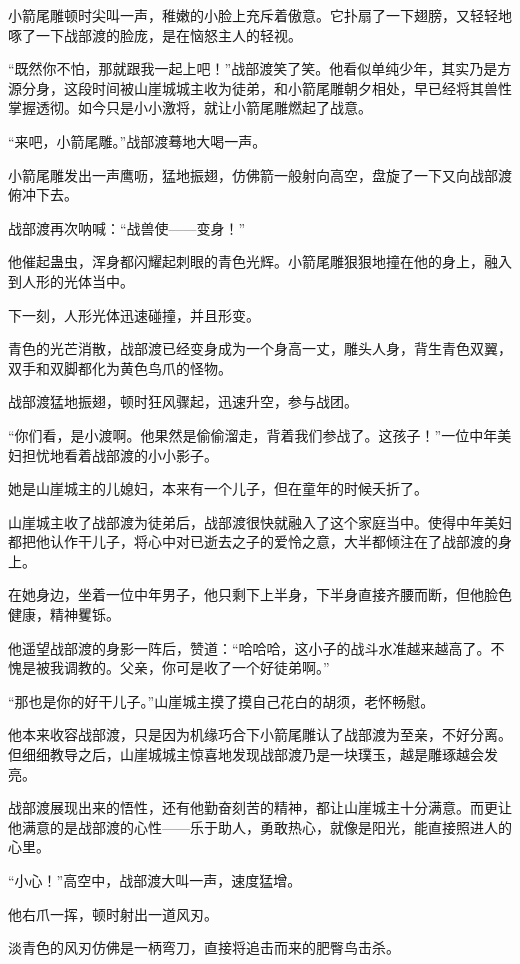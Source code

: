 \begin{this_body}
小箭尾雕顿时尖叫一声，稚嫩的小脸上充斥着傲意。它扑扇了一下翅膀，又轻轻地啄了一下战部渡的脸庞，是在恼怒主人的轻视。

“既然你不怕，那就跟我一起上吧！”战部渡笑了笑。他看似单纯少年，其实乃是方源分身，这段时间被山崖城城主收为徒弟，和小箭尾雕朝夕相处，早已经将其兽性掌握透彻。如今只是小小激将，就让小箭尾雕燃起了战意。

“来吧，小箭尾雕。”战部渡蓦地大喝一声。

小箭尾雕发出一声鹰呖，猛地振翅，仿佛箭一般射向高空，盘旋了一下又向战部渡俯冲下去。

战部渡再次呐喊：“战兽使——变身！”

他催起蛊虫，浑身都闪耀起刺眼的青色光辉。小箭尾雕狠狠地撞在他的身上，融入到人形的光体当中。

下一刻，人形光体迅速碰撞，并且形变。

青色的光芒消散，战部渡已经变身成为一个身高一丈，雕头人身，背生青色双翼，双手和双脚都化为黄色鸟爪的怪物。

战部渡猛地振翅，顿时狂风骤起，迅速升空，参与战团。

“你们看，是小渡啊。他果然是偷偷溜走，背着我们参战了。这孩子！”一位中年美妇担忧地看着战部渡的小小影子。

她是山崖城主的儿媳妇，本来有一个儿子，但在童年的时候夭折了。

山崖城主收了战部渡为徒弟后，战部渡很快就融入了这个家庭当中。使得中年美妇都把他认作干儿子，将心中对已逝去之子的爱怜之意，大半都倾注在了战部渡的身上。

在她身边，坐着一位中年男子，他只剩下上半身，下半身直接齐腰而断，但他脸色健康，精神矍铄。

他遥望战部渡的身影一阵后，赞道：“哈哈哈，这小子的战斗水准越来越高了。不愧是被我调教的。父亲，你可是收了一个好徒弟啊。”

“那也是你的好干儿子。”山崖城主摸了摸自己花白的胡须，老怀畅慰。

他本来收容战部渡，只是因为机缘巧合下小箭尾雕认了战部渡为至亲，不好分离。但细细教导之后，山崖城城主惊喜地发现战部渡乃是一块璞玉，越是雕琢越会发亮。

战部渡展现出来的悟性，还有他勤奋刻苦的精神，都让山崖城主十分满意。而更让他满意的是战部渡的心性——乐于助人，勇敢热心，就像是阳光，能直接照进人的心里。

“小心！”高空中，战部渡大叫一声，速度猛增。

他右爪一挥，顿时射出一道风刃。

淡青色的风刃仿佛是一柄弯刀，直接将追击而来的肥臀鸟击杀。


\end{this_body}
